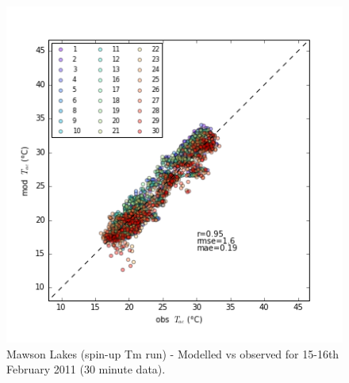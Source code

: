 \documentclass[final,3p,times,authoryear]{elsarticle}
\begin{document}
%



\begin{figure}[!htbp]
\includegraphics[trim=0mm 0mm 0mm 0mm, clip,scale=0.5]{images/MawsonModObs.png}
 \caption{Mawson Lakes (spin-up Tm run) - Modelled  vs observed  for 15-16th February 2011 (30 minute data).} \label{fig:MawsonModObs}
\end{figure}
\end{document}
